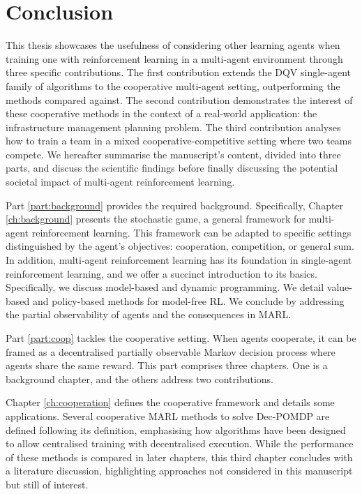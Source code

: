 \chapter{Conclusion}\label{ch:conclusion}

This thesis showcases the usefulness of considering other learning agents when training one with reinforcement learning in a multi-agent environment through three specific contributions.
The first contribution extends the DQV single-agent family of algorithms to the cooperative multi-agent setting, outperforming the methods compared against.
The second contribution demonstrates the interest of these cooperative methods in the context of a real-world application: the infrastructure management planning problem.
The third contribution analyses how to train a team in a mixed cooperative-competitive setting where two teams compete.
We hereafter summarise the manuscript's content, divided into three parts, and discuss the scientific findings before finally discussing the potential societal impact of multi-agent reinforcement learning.

Part \ref{part:background} provides the required background.
Specifically, Chapter \ref{ch:background} presents the stochastic game, a general framework for multi-agent reinforcement learning. 
This framework can be adapted to specific settings distinguished by the agent's objectives: cooperation, competition, or general sum.
In addition, multi-agent reinforcement learning has its foundation in single-agent reinforcement learning, and we offer a succinct introduction to its basics.
Specifically, we discuss model-based and dynamic programming.
We detail value-based and policy-based methods for model-free RL.
We conclude by addressing the partial observability of agents and the consequences in MARL.

Part \ref{part:coop} tackles the cooperative setting.
When agents cooperate, it can be framed as a decentralised partially observable Markov decision process where agents share the same reward.
This part comprises three chapters.
One is a background chapter, and the others address two contributions.

Chapter \ref{ch:cooperation} defines the cooperative framework and details some applications.
Several cooperative MARL methods to solve Dec-POMDP are defined following its definition, emphasising how algorithms have been designed to allow centralised training with decentralised execution.
While the performance of these methods is compared in later chapters, this third chapter concludes with a literature discussion, highlighting approaches not considered in this manuscript but still of interest.

